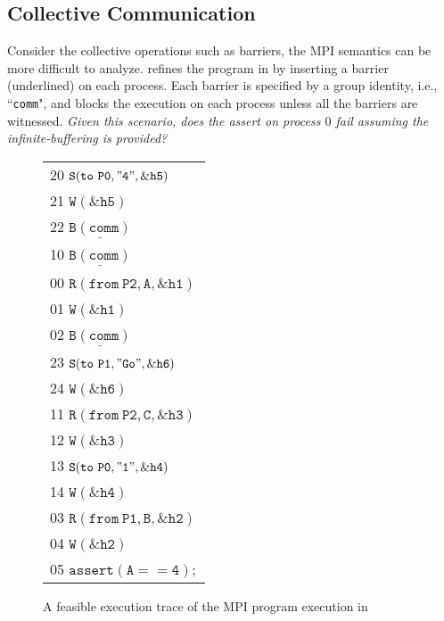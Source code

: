 
\subsection{Collective Communication}
Consider the collective operations such as barriers, the MPI semantics can be more difficult to analyze.  refines the program in  by inserting a barrier (underlined) on each process. Each barrier is specified by a group identity, i.e., ``\texttt{comm}", and blocks the execution on each process unless all the barriers are witnessed. \textit{Given this scenario, does the assert on process $0$ fail assuming the infinite-buffering is provided?}

\examplefigoneB

\begin{figure}[c]
\begin{center}
\setlength{\tabcolsep}{2pt}
\small \begin{tabular}[t]{l}
20 $\mathtt{S(to\ P0, "4", \&h5)}$ \\
21 $\mathtt{W(\&h5)}$\\
22 $\mathtt{\underline{B(comm)}}$\\
\hline
10 $\mathtt{\underline{B(comm)}}$\\
\hline
00 $\mathtt{R(from\ P2, A, \&h1)}$ \\
01 $\mathtt{W(\&h1)}$ \\
02 $\mathtt{\underline{B(comm)}}$\\
\hline
23 $\mathtt{S(to\ P1, "Go", \&h6)}$ \\
24 $\mathtt{W(\&h6)}$ \\
\hline
11 $\mathtt{R(from\ P2, C, \&h3)}$ \\
12 $\mathtt{W(\&h3)}$ \\
13 $\mathtt{S(to\ P0, "1", \&h4)}$ \\
14 $\mathtt{W(\&h4)}$ \\
\hline
03 $\mathtt{R(from\ P1, B, \&h2)}$ \\
04 $\mathtt{W(\&h2)}$ \\
05 $\mathtt{assert(A == 4);}$ \\
\hline
\end{tabular}
\end{center}
\caption{A feasible execution trace of the MPI program execution in }
\label{fig:trace3}
\end{figure}


